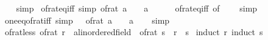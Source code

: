\begin{isabellebody}
%
\isadelimproof
\ \ %
\endisadelimproof
%
\isatagproof
{}\isamarkupfalse%
\ simp%
\endisatagproof
{\isafoldproof}%
%
\isadelimproof
\isanewline
%
\endisadelimproof
\isanewline
{}\isamarkupfalse%
\ of{\isacharunderscore}{\kern0pt}rat{\isacharunderscore}{\kern0pt}eq{\isacharunderscore}{\kern0pt}{}{\isacharunderscore}{\kern0pt}iff\ {\isacharbrackleft}{\kern0pt}simp{\isacharbrackright}{\kern0pt}{\isacharcolon}{\kern0pt}\ {\isachardoublequoteopen}of{\isacharunderscore}{\kern0pt}rat\ a\ {\isacharequal}{\kern0pt}\ {}\ {\isasymlongleftrightarrow}\ a\ {\isacharequal}{\kern0pt}\ {}{\isachardoublequoteclose}\isanewline
%
\isadelimproof
\ \ %
\endisadelimproof
%
\isatagproof
{}\isamarkupfalse%
\ of{\isacharunderscore}{\kern0pt}rat{\isacharunderscore}{\kern0pt}eq{\isacharunderscore}{\kern0pt}iff\ {\isacharbrackleft}{\kern0pt}of\ {\isacharunderscore}{\kern0pt}\ {}{\isacharbrackright}{\kern0pt}\ \isamarkupfalse%
\ simp%
\endisatagproof
{\isafoldproof}%
%
\isadelimproof
\isanewline
%
\endisadelimproof
\isanewline
{}\isamarkupfalse%
\ one{\isacharunderscore}{\kern0pt}eq{\isacharunderscore}{\kern0pt}of{\isacharunderscore}{\kern0pt}rat{\isacharunderscore}{\kern0pt}iff\ {\isacharbrackleft}{\kern0pt}simp{\isacharbrackright}{\kern0pt}{\isacharcolon}{\kern0pt}\ {\isachardoublequoteopen}{}\ {\isacharequal}{\kern0pt}\ of{\isacharunderscore}{\kern0pt}rat\ a\ {\isasymlongleftrightarrow}\ {}\ {\isacharequal}{\kern0pt}\ a{\isachardoublequoteclose}\isanewline
%
\isadelimproof
\ \ %
\endisadelimproof
%
\isatagproof
{}\isamarkupfalse%
\ simp%
\endisatagproof
{\isafoldproof}%
%
\isadelimproof
\isanewline
%
\endisadelimproof
\isanewline
{}\isamarkupfalse%
\ of{\isacharunderscore}{\kern0pt}rat{\isacharunderscore}{\kern0pt}less{\isacharcolon}{\kern0pt}\ {\isachardoublequoteopen}{\isacharparenleft}{\kern0pt}of{\isacharunderscore}{\kern0pt}rat\ r\ {\isacharcolon}{\kern0pt}{\isacharcolon}{\kern0pt}\ {\isacharprime}{\kern0pt}a{\isacharcolon}{\kern0pt}{\isacharcolon}{\kern0pt}linordered{\isacharunderscore}{\kern0pt}field{\isacharparenright}{\kern0pt}\ {\isacharless}{\kern0pt}\ of{\isacharunderscore}{\kern0pt}rat\ s\ {\isasymlongleftrightarrow}\ r\ {\isacharless}{\kern0pt}\ s{\isachardoublequoteclose}\isanewline
%
\isadelimproof
%
\endisadelimproof
%
\isatagproof
{}\isamarkupfalse%
\ {\isacharparenleft}{\kern0pt}induct\ r{\isacharcomma}{\kern0pt}\ induct\ s{\isacharparenright}{\kern0pt}\isanewline
\ \ \isamarkupfalse%

\end{isabellebody}
